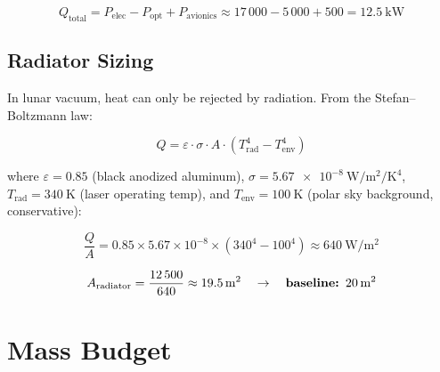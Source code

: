 \documentclass[12pt,letterpaper]{article}
\begin{document}
\[
  Q_{\text{total}} = P_{\text{elec}} - P_{\text{opt}} + P_{\text{avionics}}
                   \approx 17\,000 - 5\,000 + 500 = \SI{12.5}{\kilo\watt}
\]

\subsection{Radiator Sizing}

In lunar vacuum, heat can only be rejected by radiation. From the
Stefan--Boltzmann law:

\[
  Q = \varepsilon \cdot \sigma \cdot A \cdot \left(T_{\text{rad}}^4
    - T_{\text{env}}^4\right)
\]

where $\varepsilon = 0.85$ (black anodized aluminum), $\sigma =
\SI{5.67e-8}{\watt\per\meter\squared\per\kelvin\tothe{4}}$, $T_{\text{rad}} =
\SI{340}{\kelvin}$ (laser operating temp), and $T_{\text{env}} =
\SI{100}{\kelvin}$ (polar sky background, conservative):

\[
  \frac{Q}{A} = 0.85 \times 5.67 \times 10^{-8}
                \times \left(340^4 - 100^4\right)
              \approx \SI{640}{\watt\per\meter\squared}
\]

\[
  A_{\text{radiator}} = \frac{12\,500}{640} \approx \SI{19.5}{\meter\squared}
    \quad \rightarrow \quad \textbf{baseline: \SI{20}{\meter\squared}}
\]

\section{Mass Budget}
\end{document}
